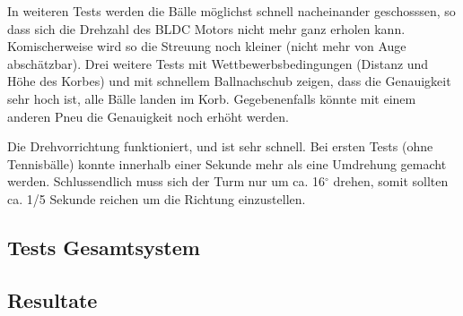 In weiteren Tests werden die Bälle möglichst schnell nacheinander geschosssen, so dass sich die Drehzahl des BLDC Motors nicht mehr ganz erholen kann. Komischerweise wird so die Streuung noch kleiner (nicht mehr von Auge abschätzbar). Drei weitere Tests mit Wettbewerbsbedingungen (Distanz und Höhe des Korbes) und mit schnellem Ballnachschub zeigen, dass die Genauigkeit sehr hoch ist, alle Bälle landen im Korb. Gegebenenfalls könnte mit einem anderen Pneu die Genauigkeit noch erhöht werden.

Die Drehvorrichtung funktioniert, und ist sehr schnell. Bei ersten Tests (ohne Tennisbälle) konnte innerhalb einer Sekunde mehr als eine Umdrehung gemacht werden. Schlussendlich muss sich der Turm nur um ca. 16$^\circ$ drehen, somit sollten ca. 1/5 Sekunde reichen um die Richtung einzustellen.



\subsection{Tests Gesamtsystem}

\subsection{Resultate}
